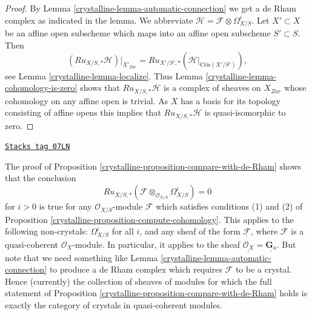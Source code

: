 \begin{proof}

By Lemma \ref{crystalline-lemma-automatic-connection} we get a de Rham complex
as indicated in the lemma. We abbreviate
$\mathcal{H} = \mathcal{F} \otimes \Omega^i_{X/S}$.
Let $X' \subset X$ be an affine open
subscheme which maps into an affine open subscheme $S' \subset S$.
Then
$$
(Ru_{X/S, *}\mathcal{H})|_{X'_{Zar}} =
Ru_{X'/S', *}(\mathcal{H}|_{\text{Cris}(X'/S')}),
$$
see Lemma \ref{crystalline-lemma-localize}. Thus
Lemma \ref{crystalline-lemma-cohomology-is-zero}
shows that $Ru_{X/S, *}\mathcal{H}$ is a complex of sheaves on
$X_{Zar}$ whose cohomology on any affine open is trivial.
As $X$ has a basis for its topology consisting of affine opens
this implies that $Ru_{X/S, *}\mathcal{H}$ is quasi-isomorphic to zero.
\end{proof}

\begin{remark}[Vanishing]
\label{crystalline-remark-vanishing}
\href{https://stacks.math.columbia.edu/tag/07LN}{\texttt{Stacks tag 07LN}}

The proof of Proposition \ref{crystalline-proposition-compare-with-de-Rham}
shows that the conclusion
$$
Ru_{X/S, *}(\mathcal{F} \otimes_{\mathcal{O}_{X/S}} \Omega^i_{X/S}) = 0
$$
for $i > 0$ is true for any $\mathcal{O}_{X/S}$-module
$\mathcal{F}$ which satisfies conditions (1) and (2) of
Proposition \ref{crystalline-proposition-compute-cohomology}.
This applies to the following non-crystals:
$\Omega^i_{X/S}$ for all $i$, and any sheaf of the form
$\underline{\mathcal{F}}$, where $\mathcal{F}$ is a quasi-coherent
$\mathcal{O}_X$-module. In particular, it applies to the
sheaf $\underline{\mathcal{O}_X} = \underline{\mathbf{G}_a}$.
But note that we need something like Lemma \ref{crystalline-lemma-automatic-connection}
to produce a de Rham complex which requires $\mathcal{F}$ to be a crystal.
Hence (currently) the collection of sheaves of modules for which the full
statement of Proposition \ref{crystalline-proposition-compare-with-de-Rham} holds
is exactly the category of crystals in quasi-coherent modules.
\end{remark}

